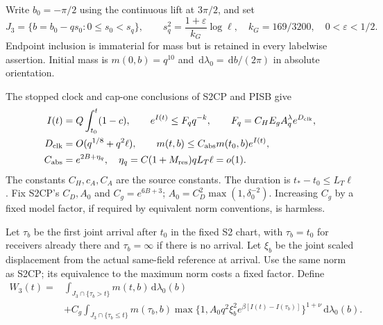 \documentclass[11pt]{article}
\theoremstyle{remark}\newtheorem{remark}[theorem]{Remark}
\newcommand{\dd}{\,\mathrm d}
\newcommand{\eps}{\varepsilon}
\begin{document}
Write $b_0=-\pi/2$ using the continuous lift at $3\pi/2$, and set
\begin{equation}
 J_3=\{b=b_0-q s_0:0\le s_0<s_q\},\qquad
 s_q^2=\frac{1+\eps}{k_G}\log\ell,\quad
 k_G=169/3200,\quad 0<\eps<1/2.
 \label{an03lsbv1:strip}
\end{equation}
Endpoint inclusion is immaterial for mass but is retained in every
labelwise assertion. Initial mass is $m(0,b)=q^{10}$ and
$\dd\lambda_0=\dd b/(2\pi)$ in absolute orientation.

The stopped clock and cap-one conclusions of S2CP and PISB give
\begin{align}
 I(t)&=Q\int_{t_0}^t(1-c),\qquad
 e^{I(t)}\le F_q q^{-k},\qquad
 F_q=C_H E_g A_q^\lambda e^{D_{\rm clk}},
 \label{an03lsbv1:clock}\\
 D_{\rm clk}&=O(q^{1/8}+q^2\ell),\qquad
 m(t,b)\le C_{\rm abs}m(t_0,b)e^{I(t)},\nonumber\\
 C_{\rm abs}&=e^{2B+\eta_q},\quad
 \eta_q=C(1+M_{\rm res})qL_T\ell=o(1).
 \label{an03lsbv1:cap}
\end{align}
The constants $C_H,c_A,C_A$ are the source constants. The duration is
$t_*-t_0\le L_T\ell$. Fix S2CP's $C_D,A_0$ and $C_g=e^{6B+3}$;
$A_0=C_D^2\max(1,\delta_0^{-2})$. Increasing $C_g$ by a fixed
model factor, if required by equivalent norm conventions, is harmless.

Let $\tau_b$ be the first joint arrival after $t_0$ in the fixed S2 chart,
with $\tau_b=t_0$ for receivers already there and $\tau_b=\infty$ if
there is no arrival. Let $\xi_b$ be the joint scaled displacement from
the actual same-field reference at arrival. Use the same norm as S2CP;
its equivalence to the maximum norm costs a fixed factor. Define
\begin{align}
 W_3(t)={}&\int_{J_3\cap\{\tau_b>t\}}m(t,b)\dd\lambda_0(b)\nonumber\\
 &+C_g\int_{J_3\cap\{\tau_b\le t\}}m(\tau_b,b)
 \max\{1,A_0q^2\xi_b^2e^{\beta[I(t)-I(\tau_b)]}\}^{1+\nu}
 \dd\lambda_0(b).
 \label{an03lsbv1:consumer}
\end{align}
\end{document}
